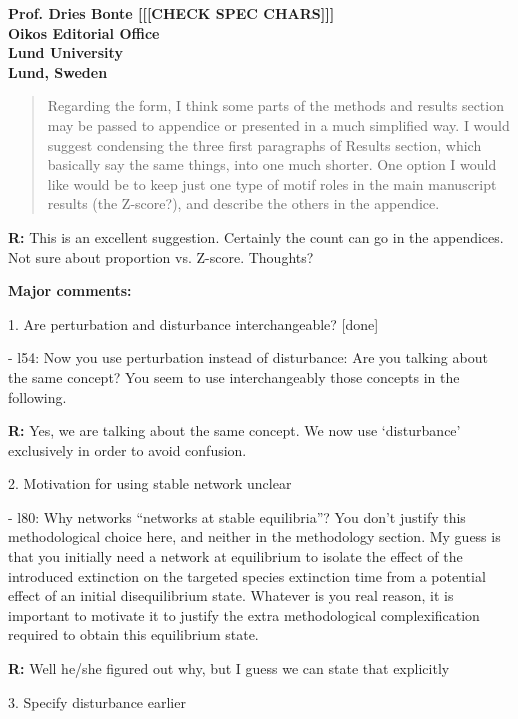 \documentclass[12pt]{letter}
\begin{document}
\begin{letter}{\bf Prof. Dries Bonte [[[CHECK SPEC CHARS]]]\\
Oikos Editorial Office \\
Lund University \\
Lund, Sweden}
  \begin{quotation}
  Regarding the form, I think some parts of the methods and results section may be passed to appendice or presented in a much simplified way. I would suggest condensing the three first paragraphs of Results section, which basically say the same things, into one much shorter. One option I would like would be to keep just one type of motif roles in the main manuscript results (the Z-score?), and describe the others in the appendice.
  \end{quotation}

  \textbf{R:} This is an excellent suggestion. Certainly the count can go in the appendices. Not sure about proportion vs. Z-score. Thoughts?


  \textbf{Major comments:}

    1. Are perturbation and disturbance interchangeable? [done]

      - l54: Now you use perturbation instead of disturbance: Are you talking about the same concept? You seem to use interchangeably those concepts in the following.

      \textbf{R:} Yes, we are talking about the same concept. We now use `disturbance' exclusively in order to avoid confusion.


    2. Motivation for using stable network unclear

      - l80: Why networks “networks at stable equilibria”? You don’t justify this methodological choice here, and neither in the methodology section. My guess is that you initially need a network at equilibrium to isolate the effect of the introduced extinction on the targeted species extinction time from a potential effect of an initial disequilibrium state. Whatever is you real reason, it is important to motivate it to justify the extra methodological complexification required to obtain this equilibrium state.

      \textbf{R:}
      Well he/she figured out why, but I guess we can state that explicitly


    3. Specify disturbance earlier


\end{letter}
\end{document}
